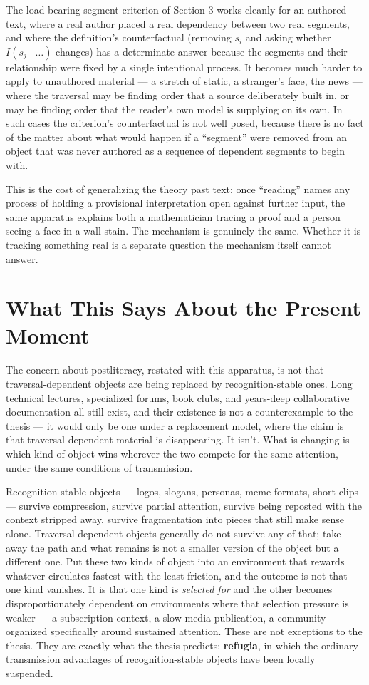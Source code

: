 \documentclass[11pt]{article}
\begin{document}
The load-bearing-segment criterion of Section 3 works cleanly for an authored text, where a real author placed a real dependency between two real segments, and where the definition's counterfactual (removing $s_i$ and asking whether $I(s_j \mid \ldots)$ changes) has a determinate answer because the segments and their relationship were fixed by a single intentional process. It becomes much harder to apply to unauthored material --- a stretch of static, a stranger's face, the news --- where the traversal may be finding order that a source deliberately built in, or may be finding order that the reader's own model is supplying on its own. In such cases the criterion's counterfactual is not well posed, because there is no fact of the matter about what would happen if a ``segment'' were removed from an object that was never authored as a sequence of dependent segments to begin with.

This is the cost of generalizing the theory past text: once ``reading'' names any process of holding a provisional interpretation open against further input, the same apparatus explains both a mathematician tracing a proof and a person seeing a face in a wall stain. The mechanism is genuinely the same. Whether it is tracking something real is a separate question the mechanism itself cannot answer.

\section{What This Says About the Present Moment}

The concern about postliteracy, restated with this apparatus, is not that traversal-dependent objects are being replaced by recognition-stable ones. Long technical lectures, specialized forums, book clubs, and years-deep collaborative documentation all still exist, and their existence is not a counterexample to the thesis --- it would only be one under a replacement model, where the claim is that traversal-dependent material is disappearing. It isn't. What is changing is which kind of object wins wherever the two compete for the same attention, under the same conditions of transmission.

Recognition-stable objects --- logos, slogans, personas, meme formats, short clips --- survive compression, survive partial attention, survive being reposted with the context stripped away, survive fragmentation into pieces that still make sense alone. Traversal-dependent objects generally do not survive any of that; take away the path and what remains is not a smaller version of the object but a different one. Put these two kinds of object into an environment that rewards whatever circulates fastest with the least friction, and the outcome is not that one kind vanishes. It is that one kind is \emph{selected for} and the other becomes disproportionately dependent on environments where that selection pressure is weaker --- a subscription context, a slow-media publication, a community organized specifically around sustained attention. These are not exceptions to the thesis. They are exactly what the thesis predicts: \textbf{refugia}, in which the ordinary transmission advantages of recognition-stable objects have been locally suspended.
\end{document}
